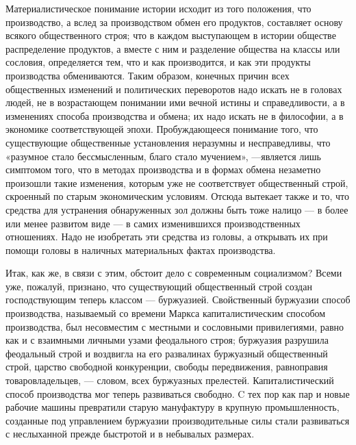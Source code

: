 \documentclass[12pt]{article}
\newcommand{\parnum}{(\arabic{parcount})}
\newcounter{parcount}
\newenvironment{parnumbers}{%
  \par%
  \everypar{\noindent \stepcounter{parcount}\marginpar[]{\parnum}}%
}{}
\begin{document}
\begin{parnumbers}
    Материалистическое понимание истории исходит из того положения, что производство, а вслед за производством обмен его продуктов, составляет основу всякого общественного строя; что в каждом выступающем в истории обществе распределение продуктов, а вместе с ним и разделение общества на классы или сословия, определяется тем, что и как производится, и как эти продукты производства обмениваются. Таким образом, конечных причин всех общественных изменений и политических переворотов надо искать не в головах людей, не в возрастающем понимании ими вечной истины и справедливости, а в изменениях способа производства и обмена; их надо искать не в философии, а в экономике соответствующей эпохи. Пробуждающееся понимание того, что существующие общественные установления неразумны и несправедливы, что «разумное стало бессмысленным, благо стало мучением», —является лишь симптомом того, что в методах производства и в формах обмена незаметно произошли такие изменения, которым уже не соответствует общественный строй, скроенный по старым экономическим условиям. Отсюда вытекает также и то, что средства для устранения обнаруженных зол должны быть тоже налицо — в более или менее развитом виде — в самих изменившихся производственных отношениях. Надо не изобретать эти средства из головы, а открывать их при помощи головы в наличных материальных фактах производства.

    Итак, как же, в связи с этим, обстоит дело с современным социализмом? Всеми уже, пожалуй, признано, что существующий общественный строй создан господствующим теперь классом — буржуазией. Свойственный буржуазии способ производства, называемый со времени Маркса капиталистическим способом производства, был несовместим с местными и сословными привилегиями, равно как и с взаимными личными узами феодального строя; буржуазия разрушила феодальный строй и воздвигла на его развалинах буржуазный общественный строй, царство свободной конкуренции, свободы передвижения, равноправия товаровладельцев, — словом, всех буржуазных прелестей. Капиталистический способ производства мог теперь развиваться свободно. C тех пор как пар и новые рабочие машины превратили старую мануфактуру в крупную промышленность, созданные под управлением буржуазии производительные силы стали развиваться с неслыханной прежде быстротой и в небывалых размерах.


\end{parnumbers}
\end{document}

